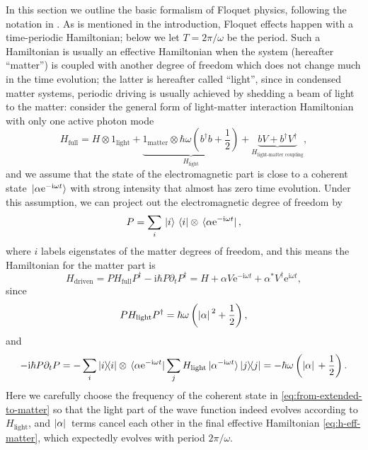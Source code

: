 \documentclass[hyperref, a4paper]{article}
\newcommand*{\ii}{\mathrm{i}}
\newcommand*{\ee}{\mathrm{e}}
\begin{document}
In this section we outline the basic formalism of Floquet physics,
following the notation in \cite{rudner2020floquet}.
As is mentioned in the introduction,
Floquet effects happen with a time-periodic Hamiltonian;
below we let $T = 2 \pi / \omega$ be the period.
Such a Hamiltonian is usually an effective Hamiltonian
when the system (hereafter ``matter'')
is coupled with another degree of freedom
which does not change much in the time evolution;
the latter is hereafter called ``light'',
since in condensed matter systems, 
periodic driving is usually achieved by 
shedding a beam of light to the matter:
consider the general form of light-matter interaction Hamiltonian 
with only one active photon mode
\begin{equation}
    H_{\text{full}} = 
    H \otimes 1_{\text{light}} +     
    \underbrace{
        1_{\text{matter}} \otimes \hbar \omega \left(
        b^\dagger b + \frac{1}{2} 
        \right) 
    }_{H_{\text{light}}}
    + \underbrace{
        b V + b^\dagger V^\dagger  
    }_{H_{\text{light-matter coupling}}} ,
    \label{eq:full-light-matter}
\end{equation}
and we assume that the state of the electromagnetic part 
is close to a coherent state $\ket*{\alpha \ee^{- \ii \omega t}}$ 
with strong intensity that almost has zero time evolution. 
Under this assumption, we can project out the electromagnetic degree of freedom by 
\begin{equation}
    P = \sum_{i} \ket*{i} \bra*{i} \otimes \bra*{\alpha \ee^{- \ii \omega t}}, 
    \label{eq:from-extended-to-matter}
\end{equation} 
where $i$ labels eigenstates of the matter degrees of freedom,
and this means the Hamiltonian for the matter part is 
\begin{equation}
    H_{\text{driven}} = P H_{\text{full}} P^\dagger - \ii \hbar P \partial_t P^\dagger = 
    H + \alpha V \ee^{- \ii \omega t} + \alpha^* V^\dagger \ee^{\ii \omega t},
    \label{eq:h-eff-matter}
\end{equation}
since 
\[
    P H_{\text{light}} P^\dagger = \hbar \omega \left(\abs*{\alpha}^2 + \frac{1}{2}\right), 
\]
and 
\[
    - \ii \hbar P \partial_t P = - \sum_i \dyad{i} \otimes \bra*{\alpha \ee^{- \ii \omega t}} 
    \sum_j H_{\text{light}} \ket*{\alpha^{-\ii \omega t}} \dyad{j}
    = - \hbar \omega \left(\abs*{\alpha} + \frac{1}{2}\right) .
\]
Here we carefully choose the frequency of the coherent state in \eqref{eq:from-extended-to-matter}
so that the light part of the wave function indeed evolves according to $H_{\text{light}}$, 
and $\abs*{\alpha}$ terms cancel each other in the final effective Hamiltonian \eqref{eq:h-eff-matter},
which expectedly evolves with period $2\pi / \omega$.
\end{document}
